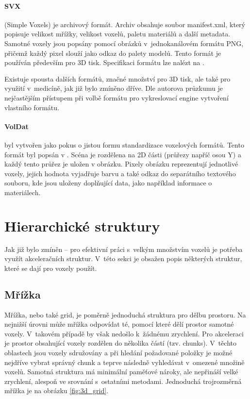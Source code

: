 \paragraph{SVX} (Simple Voxels) je archivový formát. Archiv obsahuje soubor manifest.xml, který popisuje velikost mřížky, velikost voxelů, paletu materiálů a další metadata. Samotné voxely jsou popsány pomocí obrázků v~jednokanálovém formátu PNG, přičemž každý pixel slouží jako odkaz do palety modelů. Tento formát je používán především pro 3D tisk. Specifikaci formátu lze nalézt na \cite{svx_format_2014}.

Existuje spousta dalších formátů, značné množství pro 3D tisk, ale také pro využití v~medicíně, jak již bylo zmíněno dříve. Dle autorova průzkumu je nejčastějším přístupem při volbě formátu pro vykreslovací engine vytvoření vlastního formátu.

\paragraph{VolDat} byl vytvořen jako pokus o jistou formu standardizace voxelových formátů. Tento formát byl popsán v \cite{williams_2013}. Scéna je rozdělena na 2D části (průřezy napříč osou Y) a každý tento průřez je uložen v obrázku. Pixely obrázku reprezentují jednotlivé voxely, jejich hodnota vyjadřuje barvu a také odkaz do separátního textového souboru, kde jsou uloženy doplňující data, jako například informace o materiálech. 


\section{Hierarchické struktury}
Jak již bylo zmíněn -- pro efektivní práci s~velkým množstvím voxelů je potřeba využít akceleračních struktur. V~této sekci je obsažen popis některých struktur, které se dají pro voxely použít.

\subsection{Mřížka}
Mřížka, nebo také grid, je poměrně jednoduchá struktura pro dělbu prostoru. Na nejnižší úrovni může mřížka odpovídat té, pomocí které dělí prostor samotné voxely. V~takovém případě by však nedošlo k~žádnému zrychlení. Pro akceleraci je prostor obsahující voxely rozdělen do několika částí (tzv. chunks). V~těchto oblastech jsou voxely sdružovány a při hledání požadované položky je možné nejdříve vybrat správný chunk a teprve následně vyhledávat v~omezené množině voxelů. Samotná struktura má minimální paměťové nároky, ale nepřináší velké zrychlení, alespoň ve srovnání s~ostatními metodami. Jednoduchá trojrozměrná mřížka je na obrázku \ref{fig:3d_grid}.

